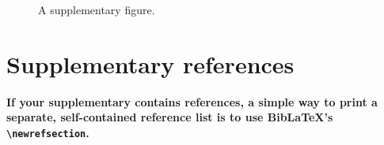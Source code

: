 \documentclass[twocolumn]{article}
\begin{document}
\begin{figure}
  \centering
  \fbox{\rule[-.5cm]{4cm}{4cm} \rule[-.5cm]{4cm}{0cm}}
  \caption{A supplementary figure.}
  \label{fig:suppfig1}
\end{figure}

\lipsum[3]

\lipsum[2]

\section{Supplementary references}

\textbf{If your supplementary contains references, a simple way to print a separate, self-contained reference list is to use BibLaTeX's \texttt{\textbackslash newrefsection}. }

\end{document}

